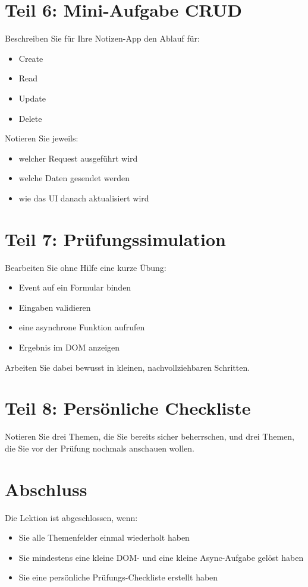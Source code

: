 \documentclass[a4paper,12pt]{article}
\begin{document}
\section{Teil 6: Mini-Aufgabe CRUD}

Beschreiben Sie für Ihre Notizen-App den Ablauf für:
\begin{itemize}
    \item Create
    \item Read
    \item Update
    \item Delete
\end{itemize}

Notieren Sie jeweils:
\begin{itemize}
    \item welcher Request ausgeführt wird
    \item welche Daten gesendet werden
    \item wie das UI danach aktualisiert wird
\end{itemize}

\section{Teil 7: Prüfungssimulation}

Bearbeiten Sie ohne Hilfe eine kurze Übung:
\begin{itemize}
    \item Event auf ein Formular binden
    \item Eingaben validieren
    \item eine asynchrone Funktion aufrufen
    \item Ergebnis im DOM anzeigen
\end{itemize}

Arbeiten Sie dabei bewusst in kleinen, nachvollziehbaren Schritten.

\section{Teil 8: Persönliche Checkliste}

Notieren Sie drei Themen, die Sie bereits sicher beherrschen, und drei Themen, die Sie vor der Prüfung nochmals anschauen wollen.

\section{Abschluss}

Die Lektion ist abgeschlossen, wenn:
\begin{itemize}
    \item Sie alle Themenfelder einmal wiederholt haben
    \item Sie mindestens eine kleine DOM- und eine kleine Async-Aufgabe gelöst haben
    \item Sie eine persönliche Prüfungs-Checkliste erstellt haben
\end{itemize}
\end{document}
